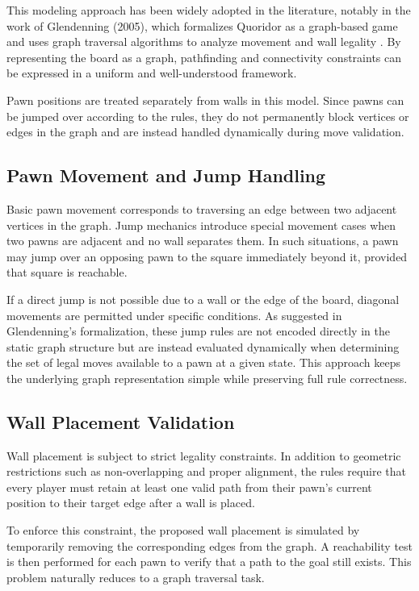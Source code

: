 \documentclass[a4paper]{article}
\begin{document}
This modeling approach has been widely adopted in the literature, notably in
the work of Glendenning (2005), which formalizes Quoridor as a graph-based game
and uses graph traversal algorithms to analyze movement and wall legality
\cite{glendenning2005quoridor}. By representing the board as a graph,
pathfinding and connectivity constraints can be expressed in a uniform and
well-understood framework.

Pawn positions are treated separately from walls in this model. Since pawns
can be jumped over according to the rules, they do not permanently block
vertices or edges in the graph and are instead handled dynamically during move
validation.

\subsection{Pawn Movement and Jump Handling}

Basic pawn movement corresponds to traversing an edge between two adjacent
vertices in the graph. Jump mechanics introduce special movement cases when
two pawns are adjacent and no wall separates them. In such situations, a pawn
may jump over an opposing pawn to the square immediately beyond it, provided
that square is reachable.

If a direct jump is not possible due to a wall or the edge of the board,
diagonal movements are permitted under specific conditions. As suggested in
Glendenning's formalization, these jump rules are not encoded directly in the
static graph structure but are instead evaluated dynamically when determining
the set of legal moves available to a pawn at a given state. This approach
keeps the underlying graph representation simple while preserving full rule
correctness.

\subsection{Wall Placement Validation}

Wall placement is subject to strict legality constraints. In addition to
geometric restrictions such as non-overlapping and proper alignment, the rules
require that every player must retain at least one valid path from their pawn's
current position to their target edge after a wall is placed.

To enforce this constraint, the proposed wall placement is simulated by
temporarily removing the corresponding edges from the graph. A reachability
test is then performed for each pawn to verify that a path to the goal still
exists. This problem naturally reduces to a graph traversal task.
\end{document}
